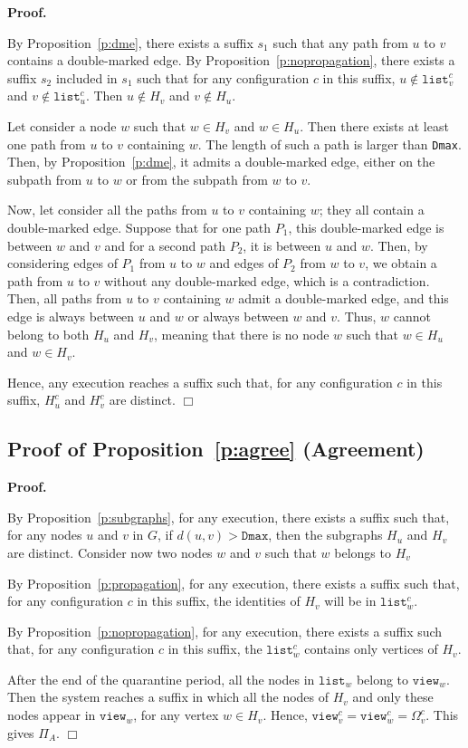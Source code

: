 \documentclass[11pt,english]{article}
\newenvironment{proof}[1][0cm]{
  \begin{list}{\bf Proof.~}{
      \setlength{\itemindent}{0cm}
      \setlength{\labelsep}{0cm}
      \setlength{\labelwidth}{#1}
      \setlength{\leftmargin}{#1}
    \item
    }
}{\hfill$\Box$
  \end{list}
}
\begin{document}
\begin{proof}
  By Proposition~\ref{p:dme}, there exists a suffix $s_1$ such that any path
  from $u$ to $v$ contains a double-marked edge. By
  Proposition~\ref{p:nopropagation}, there exists a suffix $s_2$ included in
  $s_1$ such that for any configuration $c$ in this suffix, $u \not\in
  \texttt{list}_v^c$ and $v \not\in\texttt{list}_u^c$. Then $u \not\in H_v$ and
  $v \not\in H_u$.

  Let consider a node $w$ such that $w \in H_v$ and $w\in H_u$. Then there
  exists at least one path from $u$ to $v$ containing $w$. The length of such a
  path is larger than \texttt{Dmax}. Then, by Proposition~\ref{p:dme}, it
  admits a double-marked edge, either on the subpath from $u$ to $w$ or from the
  subpath from $w$ to $v$.

  Now, let consider all the paths from $u$ to $v$ containing $w$; they all
  contain a double-marked edge. Suppose that for one path $P_1$, this double-marked edge is between $w$ and $v$ and for a second path $P_2$, it is between
  $u$ and $w$. Then, by considering edges of $P_1$ from $u$ to $w$ and edges of
  $P_2$ from $w$ to $v$, we obtain a path from $u$ to $v$ without any double-marked edge, which is a contradiction. Then, all paths from $u$ to $v$
  containing $w$ admit a double-marked edge, and this edge is always between $u$
  and $w$ or always between $w$ and $v$. Thus, $w$ cannot belong to both $H_u$
  and $H_v$, meaning that there is no node $w$ such that $w \in H_u$ and $w\in
  H_v$.

  Hence, any execution reaches a suffix such that, for any configuration $c$ in
  this suffix, $H_u^c$ and $H_v^c$ are distinct.
\end{proof} 



\subsection{Proof of Proposition~\ref{p:agree} (Agreement)}

\begin{proof}
  By Proposition~\ref{p:subgraphs}, for any execution, there exists a suffix
  such that, for any nodes $u$ and $v$ in $G$, if $d(u,v) > \texttt{Dmax}$,
  then the subgraphs $H_u$ and $H_v$ are distinct. Consider now two nodes $w$
  and $v$ such that $w$ belongs to $H_v$

  By Proposition~\ref{p:propagation}, for any execution, there exists a suffix
  such that, for any configuration $c$ in this suffix, the identities of $H_v$
  will be in $\texttt{list}_w^c$.

  By Proposition~\ref{p:nopropagation}, for any execution, there exists a suffix
  such that, for any configuration $c$ in this suffix, the $\texttt{list}_w^c$
  contains only vertices of $H_v$.

  After the end of the quarantine period, all the nodes in $\texttt{list}_w$
  belong to $\texttt{view}_w$.  Then the system reaches a suffix in which all
  the nodes of $H_v$ and only these nodes appear in $\texttt{view}_w$, for any
  vertex $w \in H_v$. Hence, $\texttt{view}_v^c = \texttt{view}_w^c =
  \Omega_v^c$. This gives $\Pi_A$.
\end{proof}
\end{document}
